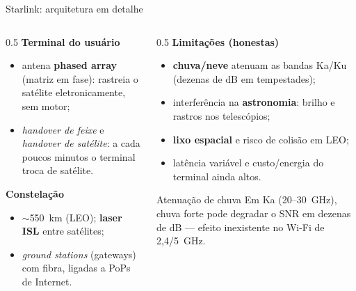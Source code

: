 \documentclass[aspectratio=169,11pt]{beamer}
\begin{document}
\begin{frame}{Starlink: arquitetura em detalhe}
  \begin{columns}
    \begin{column}{0.5\textwidth}
      \textbf{Terminal do usuário}
      \begin{itemize}
        \item antena \textbf{phased array} (matriz em fase): rastreia o satélite eletronicamente, sem motor;
        \item \emph{handover de feixe} e \emph{handover de satélite}: a cada poucos minutos o terminal troca de satélite.
      \end{itemize}
      \textbf{Constelação}
      \begin{itemize}
        \item $\sim$550~km (LEO); \textbf{laser ISL} entre satélites;
        \item \emph{ground stations} (gateways) com fibra, ligadas a PoPs de Internet.
      \end{itemize}
    \end{column}
    \begin{column}{0.5\textwidth}
      \textbf{Limitações (honestas)}
      \begin{itemize}
        \item \textbf{chuva/neve} atenuam as bandas Ka/Ku (dezenas de dB em tempestades);
        \item interferência na \textbf{astronomia}: brilho e rastros nos telescópios;
        \item \textbf{lixo espacial} e risco de colisão em LEO;
        \item latência variável e custo/energia do terminal ainda altos.
      \end{itemize}
      \begin{exampleblock}{Atenuação de chuva}
        Em Ka (20--30~GHz), chuva forte pode degradar o SNR em dezenas de dB --- efeito inexistente no Wi-Fi de 2,4/5~GHz.
      \end{exampleblock}
    \end{column}
  \end{columns}
\end{frame}
\end{document}
